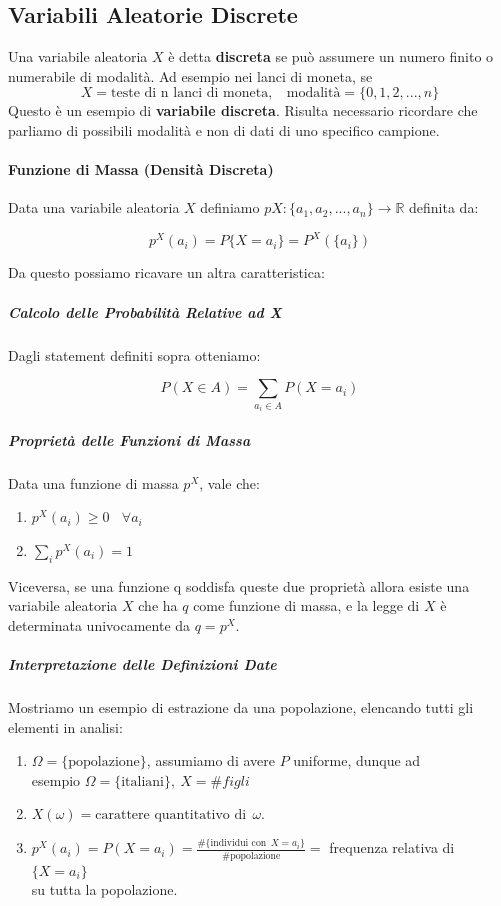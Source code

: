 \documentclass{article}
\begin{document}
\subsection{Variabili Aleatorie Discrete}

Una variabile aleatoria $X$ è detta \textbf{discreta} se può assumere un numero finito o numerabile di modalità. Ad esempio nei lanci di moneta, se
\[ X = \text{teste di n lanci di moneta}, \:\:\:\: \text{modalità} = \{ 0,1,2, ..., n \} \]
Questo è un esempio di \textbf{variabile discreta}. Risulta necessario ricordare che parliamo di possibili modalità e non di dati di uno specifico campione.

\newpage

\paragraph{Funzione di Massa (Densità Discreta)}

Data una variabile aleatoria $X$ definiamo $p{X}: \{ a_{1}, a_{2}, ..., a_{n} \} \rightarrow \mathbb{R} $ definita da:

\[ p^{X}(a_{i}) = P\{ X = a_{i} \} = P^{X}(\{a_{i}\}) \]

Da questo possiamo ricavare un altra caratteristica:

\subparagraph{Calcolo delle Probabilità Relative ad X} Dagli statement definiti sopra otteniamo:

\[ P(X \in A) = \sum_{a_{i}\in A} P(X=a_{i}) \]

\subparagraph{Proprietà delle Funzioni di Massa} Data una funzione di massa $p^{X}$, vale che:

\begin{enumerate}
    \item $p^{X}(a_{i}) \geq 0 \:\:\:\: \forall a_{i} $
    \item $\sum_{i}p^{X}(a_{i}) = 1$
\end{enumerate}

Viceversa, se una funzione q soddisfa queste due proprietà allora esiste una variabile aleatoria $X$ che ha $q$ come funzione di massa, e la legge di $X$
è determinata univocamente da $q=p^{X}$.

\subparagraph{Interpretazione delle Definizioni Date} Mostriamo un esempio di estrazione da una popolazione, elencando tutti gli elementi in analisi:

\begin{enumerate}
    \item $\Omega = \{ \text{popolazione} \} $, assumiamo di avere $P$ uniforme, dunque ad \\ esempio $\Omega = \{ \text{italiani} \}, \: X = \#figli $
    \item $X(\omega) = \text{carattere quantitativo di} \:\: \omega$.
    \item $p^{X}(a_{i}) = P(X=a_{i}) = \frac{\#\{ \text{individui con} \: \: X = a_{i} \}}{\#\text{popolazione}} = $ frequenza relativa di  $ \{ X = a_{i} \} $ \\ su tutta la popolazione.
\end{enumerate}
\end{document}
